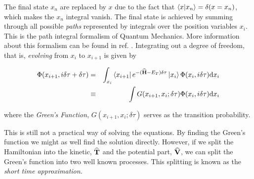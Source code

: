The final state $x_n$ are replaced by $x$ due to the fact that $\left\langle x | x_n\right\rangle = \delta(x=x_n)$, which makes the $x_n$ integral vanish. The final state is achieved by summing through all possible \textit{paths} represented by integrals over the position variables $x_i$. This is the path integral formalism of Quantum Mechanics. More information about this formalism can be found in ref. \cite{leinaas}. Integrating out a degree of freedom, that is, \textit{evolving} from $x_i$ to $x_{i+1}$ is given by

\begin{eqnarray}
\Phi(x_{i+1}, i\delta\tau + \delta\tau) &=& \int_{x_i}\left< x_{i+1} \right|e^{-({\bf\widehat{H}} - E_T)\delta\tau}\left| x_{i} \right>\Phi(x_i, i\delta\tau)\mathrm{d}x_{i} \\
&\equiv& \int G(x_{i+1}, x_i; \delta\tau)\Phi(x_i, i\delta\tau)\mathrm{d}x_i
\end{eqnarray}

where the \textit{Green's Function}, $G(x_{i+1}, x_i; \delta\tau)$ serves as the transition probability. 

% 
% 
% 
% 

This is still not a practical way of solving the equations. By finding the Green's function we might as well find the solution directly. However, if we split the Hamiltonian into the kinetic, ${\bf\widehat{T}}$ and the potential part, ${\bf\widehat{V}}$, we can split the Green's function into two well known processes. This splitting is known as the \textit{short time approximation}.

